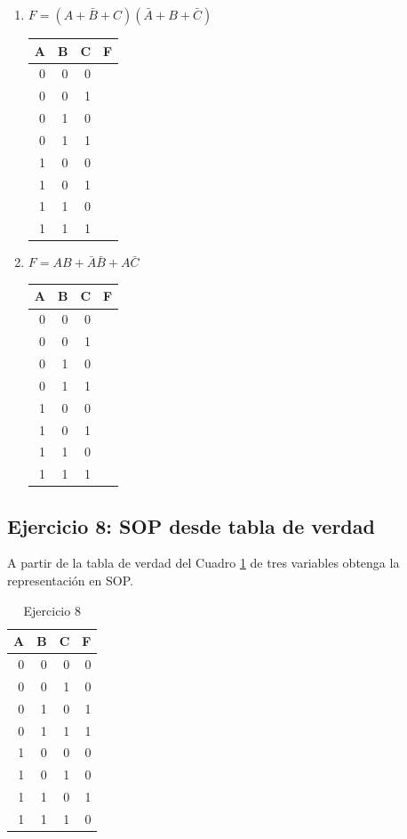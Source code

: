 \documentclass[11pt]{article}
\begin{document}
\begin{enumerate}
\item \(F = (A+\bar{B}+C)(\bar{A}+B+\bar{C})\)

\begin{center}
\begin{tabular}{rrrl}
A & B & C & F\\[0pt]
\hline
0 & 0 & 0 & \\[0pt]
0 & 0 & 1 & \\[0pt]
0 & 1 & 0 & \\[0pt]
0 & 1 & 1 & \\[0pt]
1 & 0 & 0 & \\[0pt]
1 & 0 & 1 & \\[0pt]
1 & 1 & 0 & \\[0pt]
1 & 1 & 1 & \\[0pt]
\end{tabular}
\end{center}

\item \(F = AB+\bar{A}\bar{B}+A\bar{C}\)

\begin{center}
\begin{tabular}{rrrl}
A & B & C & F\\[0pt]
\hline
0 & 0 & 0 & \\[0pt]
0 & 0 & 1 & \\[0pt]
0 & 1 & 0 & \\[0pt]
0 & 1 & 1 & \\[0pt]
1 & 0 & 0 & \\[0pt]
1 & 0 & 1 & \\[0pt]
1 & 1 & 0 & \\[0pt]
1 & 1 & 1 & \\[0pt]
\end{tabular}
\end{center}
\end{enumerate}

\subsection{Ejercicio 8: SOP desde tabla de verdad}
\label{sec:org98b4be8}
A partir de la tabla de verdad del Cuadro \ref{tab:org5e0ca1d} de tres variables obtenga la
representación en SOP.

\begin{table}[htbp]
\caption{\label{tab:org5e0ca1d}Ejercicio 8}
\centering
\begin{tabular}{rrrr}
A & B & C & F\\[0pt]
\hline
0 & 0 & 0 & 0\\[0pt]
0 & 0 & 1 & 0\\[0pt]
0 & 1 & 0 & 1\\[0pt]
0 & 1 & 1 & 1\\[0pt]
1 & 0 & 0 & 0\\[0pt]
1 & 0 & 1 & 0\\[0pt]
1 & 1 & 0 & 1\\[0pt]
1 & 1 & 1 & 0\\[0pt]
\end{tabular}
\end{table}
\end{document}
